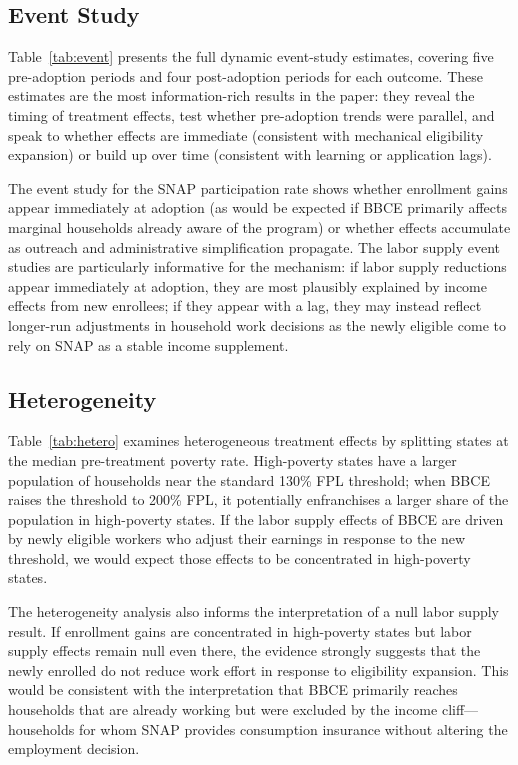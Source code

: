 \documentclass[12pt]{article}
\begin{document}
\subsection{Event Study}

Table~\ref{tab:event} presents the full dynamic event-study estimates, covering five pre-adoption periods and four post-adoption periods for each outcome. These estimates are the most information-rich results in the paper: they reveal the timing of treatment effects, test whether pre-adoption trends were parallel, and speak to whether effects are immediate (consistent with mechanical eligibility expansion) or build up over time (consistent with learning or application lags).



The event study for the SNAP participation rate shows whether enrollment gains appear immediately at adoption (as would be expected if BBCE primarily affects marginal households already aware of the program) or whether effects accumulate as outreach and administrative simplification propagate. The labor supply event studies are particularly informative for the mechanism: if labor supply reductions appear immediately at adoption, they are most plausibly explained by income effects from new enrollees; if they appear with a lag, they may instead reflect longer-run adjustments in household work decisions as the newly eligible come to rely on SNAP as a stable income supplement.

\subsection{Heterogeneity}

Table~\ref{tab:hetero} examines heterogeneous treatment effects by splitting states at the median pre-treatment poverty rate. High-poverty states have a larger population of households near the standard 130\% FPL threshold; when BBCE raises the threshold to 200\% FPL, it potentially enfranchises a larger share of the population in high-poverty states. If the labor supply effects of BBCE are driven by newly eligible workers who adjust their earnings in response to the new threshold, we would expect those effects to be concentrated in high-poverty states.



The heterogeneity analysis also informs the interpretation of a null labor supply result. If enrollment gains are concentrated in high-poverty states but labor supply effects remain null even there, the evidence strongly suggests that the newly enrolled do not reduce work effort in response to eligibility expansion. This would be consistent with the interpretation that BBCE primarily reaches households that are already working but were excluded by the income cliff---households for whom SNAP provides consumption insurance without altering the employment decision.
\end{document}
